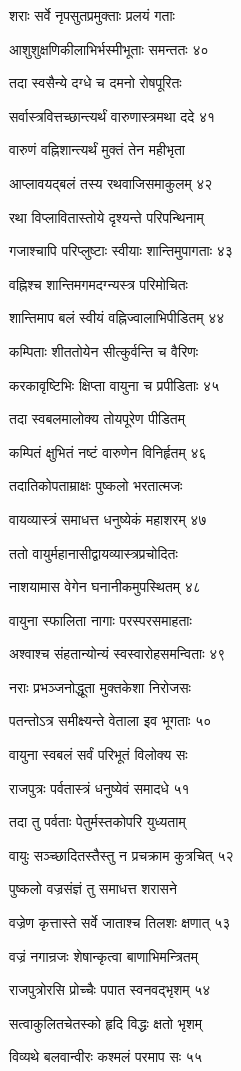 शराः सर्वे नृपसुतप्रमुक्ताः प्रलयं गताः

आशुशुक्षणिकीलाभिर्भस्मीभूताः समन्ततः ४०

तदा स्वसैन्ये दग्धे च दमनो रोषपूरितः

सर्वास्त्रवित्तच्छान्त्यर्थं वारुणास्त्रमथा ददे ४१

वारुणं वह्निशान्त्यर्थं मुक्तं तेन महीभृता

आप्लावयद्बलं तस्य रथवाजिसमाकुलम् ४२

रथा विप्लावितास्तोये दृश्यन्ते परिपन्थिनाम्

गजाश्चापि परिप्लुष्टाः स्वीयाः शान्तिमुपागताः ४३

वह्निश्च शान्तिमगमदग्न्यस्त्र परिमोचितः

शान्तिमाप बलं स्वीयं वह्निज्वालाभिपीडितम् ४४

कम्पिताः शीततोयेन सीत्कुर्वन्ति च वैरिणः

करकावृष्टिभिः क्षिप्ता वायुना च प्रपीडिताः ४५

तदा स्वबलमालोक्य तोयपूरेण पीडितम्

कम्पितं क्षुभितं नष्टं वारुणेन विनिर्हृतम् ४६

तदातिकोपताम्राक्षः पुष्कलो भरतात्मजः

वायव्यास्त्रं समाधत्त धनुष्येकं महाशरम् ४७

ततो वायुर्महानासीद्वायव्यास्त्रप्रचोदितः

नाशयामास वेगेन घनानीकमुपस्थितम् ४८

वायुना स्फालिता नागाः परस्परसमाहताः

अश्वाश्च संहतान्योन्यं स्वस्वारोहसमन्विताः ४९

नराः प्रभञ्जनोद्धूता मुक्तकेशा निरोजसः

पतन्तोऽत्र समीक्ष्यन्ते वेताला इव भूगताः ५०

वायुना स्वबलं सर्वं परिभूतं विलोक्य सः

राजपुत्रः पर्वतास्त्रं धनुष्येवं समादधे ५१

तदा तु पर्वताः पेतुर्मस्तकोपरि युध्यताम्

वायुः सञ्च्छादितस्तैस्तु न प्रचक्राम कुत्रचित् ५२

पुष्कलो वज्रसंज्ञं तु समाधत्त शरासने

वज्रेण कृत्तास्ते सर्वे जाताश्च तिलशः क्षणात् ५३

वज्रं नगान्रजः शेषान्कृत्वा बाणाभिमन्त्रितम्

राजपुत्रोरसि प्रोच्चैः पपात स्वनवद्भृशम् ५४

सत्वाकुलितचेतस्को हृदि विद्धः क्षतो भृशम्

विव्यथे बलवान्वीरः कश्मलं परमाप सः ५५

